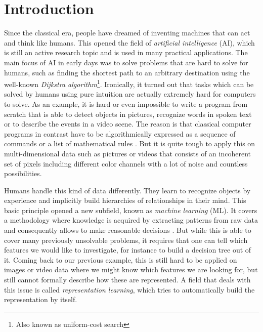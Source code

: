 

\chapter{Introduction} \label{chapter:introduction}

Since the classical era, people have dreamed of inventing machines that can act and think like humans. This opened the field of \textit{artificial intelligence} (AI), which is still an active research topic and is used in many practical applications. The main focus of AI in early days was to solve problems that are hard to solve for humans, such as finding the shortest path to an arbitrary destination using the well-known \textit{Dijkstra algorithm}\footnote{Also known as uniform-cost search}. Ironically, it turned out that tasks which can be solved by humans using pure intuition are actually extremely hard for computers to solve. As an example, it is hard or even impossible to write a program from scratch that is able to detect objects in pictures, recognize words in spoken text or to describe the events in a video scene. The reason is that classical computer programs in contrast have to be algorithmically expressed as a sequence of commands or a list of mathematical rules \parencite{deep_learning}. But it is quite tough to apply this on multi-dimensional data such as pictures or videos that consists of an incoherent set of pixels including different color channels with a lot of noise and countless possibilities. 

Humans handle this kind of data differently. They learn to recognize objects by experience and implicitly build hierarchies of relationships in their mind. This basic principle opened a new subfield, known as \textit{machine learning} (ML). It covers a methodology where knowledge is acquired by extracting patterns from raw data and consequently allows to make reasonable decisions \parencite{deep_learning}. But while this is able to cover many previously unsolvable problems, it requires that one can tell which features we would like to investigate, for instance to build a decision tree out of it. Coming back to our previous example, this is still hard to be applied on images or video data where we might know which features we are looking for, but still cannot formally describe how these are represented. A field that deals with this issue is called \textit{representation learning}, which tries to automatically build the representation by itself.

